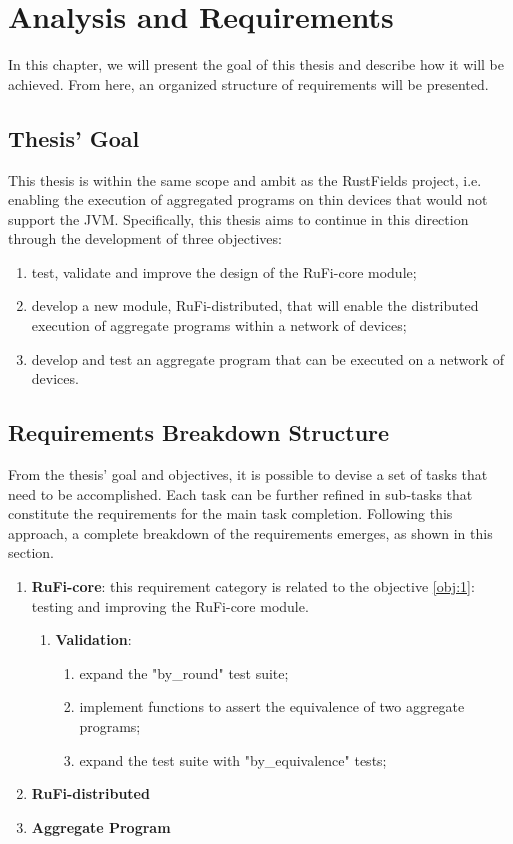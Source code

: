
\chapter{Analysis and Requirements}
\label{chap:requirements}
In this chapter, we will present the goal of this thesis and describe how it will be achieved. From here, an organized structure of requirements will be presented.

\section{Thesis' Goal}
\label{sec:goal}
This thesis is within the same scope and ambit as the RustFields project, i.e. enabling the execution of aggregated programs on thin devices that would not support the JVM.
Specifically, this thesis aims to continue in this direction through the development of three objectives:

\begin{enumerate}
    \item \label{obj:1} test, validate and improve the design of the RuFi-core module;
    \item \label{obj:2} develop a new module, RuFi-distributed, that will enable the distributed execution of aggregate programs within a network of devices;
    \item \label{obj:3} develop and test an aggregate program that can be executed on a network of devices.
\end{enumerate}

\section{Requirements Breakdown Structure}
\label{sec:rbs}
From the thesis' goal and objectives, it is possible to devise a set of tasks that need to be accomplished. Each task can be further refined in sub-tasks that constitute the requirements for the main task completion.
Following this approach, a complete breakdown of the requirements emerges, as shown in this section.

\begin{enumerate}
    \item \textbf{RuFi-core}: this requirement category is related to the objective \ref{obj:1}: testing and improving the RuFi-core module.
    \begin{enumerate}
        \item \textbf{Validation}:
            \begin{enumerate}
                \item expand the "by_round" test suite;
                \item implement functions to assert the equivalence of two aggregate programs;
                \item expand the test suite with "by_equivalence" tests;
            \end{enumerate}
    \end{enumerate}
    \item \textbf{RuFi-distributed}
    \item \textbf{Aggregate Program}
\end{enumerate}
